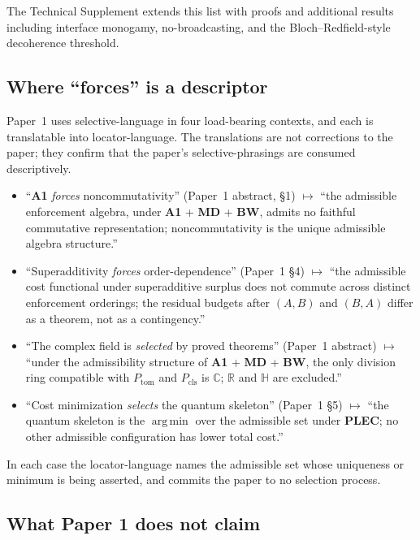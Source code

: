 \documentclass[11pt]{article}
\newcommand{\Aone}{\textbf{A1}}
\newcommand{\PLEC}{\textbf{PLEC}}
\newcommand{\argmin}{\mathop{\mathrm{arg\,min}}}
\begin{document}
\noindent The Technical Supplement extends this list with proofs and additional results including interface monogamy, no-broadcasting, and the Bloch--Redfield-style decoherence threshold.

\subsection{Where ``forces'' is a descriptor}\label{sec:P1_forces}

Paper~1 uses selective-language in four load-bearing contexts, and each is translatable into locator-language. The translations are not corrections to the paper; they confirm that the paper's selective-phrasings are consumed descriptively.

\begin{itemize}
    \item ``\Aone{} \emph{forces} noncommutativity'' (Paper~1 abstract, \S1) $\longmapsto$ ``the admissible enforcement algebra, under \Aone{} + \textbf{MD} + \textbf{BW}, admits no faithful commutative representation; noncommutativity is the unique admissible algebra structure.''
    \item ``Superadditivity \emph{forces} order-dependence'' (Paper~1 \S4) $\longmapsto$ ``the admissible cost functional under superadditive surplus does not commute across distinct enforcement orderings; the residual budgets after $(A, B)$ and $(B, A)$ differ as a theorem, not as a contingency.''
    \item ``The complex field is \emph{selected} by proved theorems'' (Paper~1 abstract) $\longmapsto$ ``under the admissibility structure of \Aone{} + \textbf{MD} + \textbf{BW}, the only division ring compatible with $P_{\mathrm{tom}}$ and $P_{\mathrm{cls}}$ is $\mathbb{C}$; $\mathbb{R}$ and $\mathbb{H}$ are excluded.''
    \item ``Cost minimization \emph{selects} the quantum skeleton'' (Paper~1 \S5) $\longmapsto$ ``the quantum skeleton is the $\argmin$ over the admissible set under \PLEC{}; no other admissible configuration has lower total cost.''
\end{itemize}

\noindent In each case the locator-language names the admissible set whose uniqueness or minimum is being asserted, and commits the paper to no selection process.

\subsection{What Paper 1 does not claim}\label{sec:P1_does_not_claim}
\end{document}
